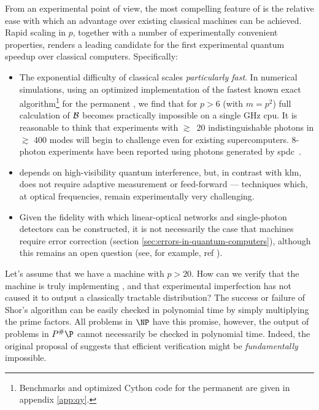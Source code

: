 From an experimental point of view, the most compelling feature of \bosonsampling is the relative ease with which an advantage over existing classical machines can be achieved. 
Rapid scaling in $p$, together with a number of experimentally convenient properties, renders \bosonsampling a leading candidate for the first experimental quantum speedup over classical computers.
Specifically:
\begin{itemize}
    \item The exponential difficulty of classical \bosonsampling scales \emph{particularly fast}. In numerical simulations, using an optimized implementation of the fastest known exact algorithm\footnote{Benchmarks and optimized Cython code for the permanent are given in appendix \ref{app:qy}.} for the permanent \cite{Ryser1963}, we find that for $p>6$ (with $m=p^2$) full calculation of $\mathcal{B}$ becomes practically impossible on a single GHz \gls{cpu}.  It is reasonable to think that experiments with $\gtrsim$~20 indistinguishable photons in $\gtrsim$ 400 modes will begin to challenge even for existing supercomputers. 8-photon experiments have been reported using photons generated by \gls{spdc}~\cite{Yao2012}. 
\item \bosonsampling depends on high-visibility quantum interference, but, in contrast with \gls{klm}, does not require adaptive measurement or feed-forward --- techniques which, at optical frequencies, remain experimentally very challenging. %
\item Given the fidelity with which linear-optical networks and single-photon detectors can be constructed, it is not necessarily the case that \bosonsampling machines require error correction (section \ref{sec:errors-in-quantum-computers}), although this remains an open question (see, for example, ref \cite{Leverrier2013}).
\end{itemize}

Let's assume that we have a \bosonsampling machine with $p>20$. How can we verify that the machine is truly implementing \bosonsampling, and that experimental imperfection has not caused it to output a classically tractable distribution?  The success or failure of Shor's algorithm can be easily checked in polynomial time by simply multiplying the prime factors. All problems in $\NP$ have this promise, however, the output of problems in $P^\#\P$ cannot necessarily be checked in polynomial time. Indeed, the original proposal of \bosonsampling suggests that efficient verification might be \emph{fundamentally} impossible. 

